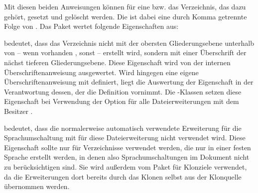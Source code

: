 \begin{Declaration}
\end{Declaration}
Mit diesen beiden Anweisungen können  für eine
 bzw. das Verzeichnis, das dazu gehört, gesetzt und
gelöscht werden. Die  ist dabei eine durch
Komma getrennte Folge von . Das Paket
 wertet folgende Eigenschaften aus:
\begin{description}%
\item[\PValue{leveldown}] bedeutet, dass das Verzeichnis nicht mit der
  obersten Gliederungsebene unterhalb von  -- wenn
  vorhanden , sonst 
  -- erstellt wird, sondern mit einer Überschrift der nächst tieferen
  Gliederungsebene. Diese Eigenschaft wird von der internen
  Überschriftenanweisung ausgewertet. Wird  hingegen eine
  eigene Überschriftenanweisung mit 
  definiert, liegt die Auswertung der Eigenschaft in der Verantwortung dessen,
  der die Definition vornimmt. Die \KOMAScript-Klassen setzen diese
  Eigenschaft bei Verwendung der Option
   für alle Dateierweiterungen mit
  dem Besitzer .
\item[\PValue{nobabel}] bedeutet, dass die normalerweise automatisch
  verwendete Erweiterung für die Sprachumschaltung mit
   für diese Dateierweiterung nicht
  verwendet wird. Diese Eigenschaft sollte nur für Verzeichnisse verwendet
  werden, die nur in einer festen Sprache erstellt werden, in denen also
  Sprachumschaltungen im Dokument nicht zu berücksichtigen sind. Sie wird
  außerdem vom Paket
   für
  Klonziele verwendet, da die Erweiterungen dort bereits durch das Klonen
  selbst aus der Klonquelle übernommen werden.


\end{description}
